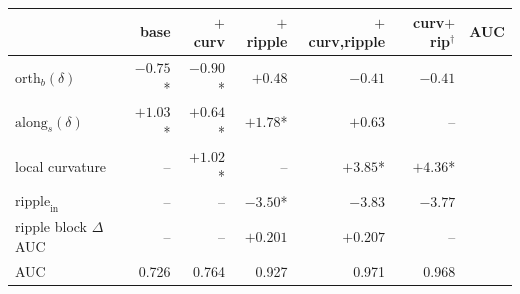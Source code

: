 \begin{table}[t]
\begin{tabular}{l r r r r r r}
\toprule
 & base & $+$curv & $+$ripple & $+$curv,ripple & curv$+$rip$^\dagger$ & AUC \\
\midrule
$\mathrm{orth}_b(\delta)$ & $-0.75$* & $-0.90$* & $+0.48$ & $-0.41$ & $-0.41$ &  \\
$\mathrm{along}_s(\delta)$ & $+1.03$* & $+0.64$* & $+1.78$* & $+0.63$ & -- &  \\
local curvature & -- & $+1.02$* & -- & $+3.85$* & $+4.36$* &  \\
$\mathrm{ripple}_\mathrm{in}$ & -- & -- & $-3.50$* & $-3.83$ & $-3.77$ &  \\
ripple block $\Delta$AUC & -- & -- & $+0.201$ & $+0.207$ & -- &  \\
AUC & 0.726 & 0.764 & 0.927 & 0.971 & 0.968 &  \\
\bottomrule
\end{tabular}

\end{table}
